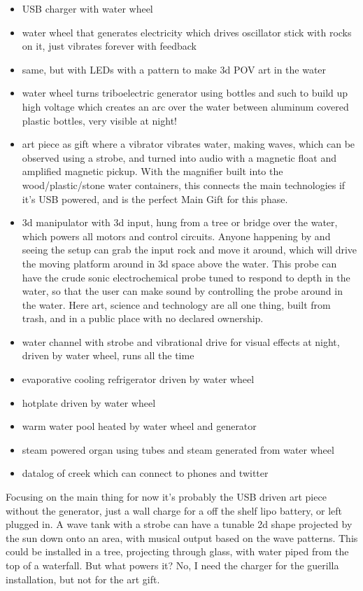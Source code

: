 \begin{itemize}
\tightlist
\item
  USB charger with water wheel
\item
  water wheel that generates electricity which drives oscillator stick
  with rocks on it, just vibrates forever with feedback
\item
  same, but with LEDs with a pattern to make 3d POV art in the water
\item
  water wheel turns triboelectric generator using bottles and such to
  build up high voltage which creates an arc over the water between
  aluminum covered plastic bottles, very visible at night!
\item
  art piece as gift where a vibrator vibrates water, making waves, which
  can be observed using a strobe, and turned into audio with a magnetic
  float and amplified magnetic pickup. With the magnifier built into the
  wood/plastic/stone water containers, this connects the main
  technologies if it's USB powered, and is the perfect Main Gift for
  this phase.
\item
  3d manipulator with 3d input, hung from a tree or bridge over the
  water, which powers all motors and control circuits. Anyone happening
  by and seeing the setup can grab the input rock and move it around,
  which will drive the moving platform around in 3d space above the
  water. This probe can have the crude sonic electrochemical probe tuned
  to respond to depth in the water, so that the user can make sound by
  controlling the probe around in the water. Here art, science and
  technology are all one thing, built from trash, and in a public place
  with no declared ownership.
\item
  water channel with strobe and vibrational drive for visual effects at
  night, driven by water wheel, runs all the time
\item
  evaporative cooling refrigerator driven by water wheel
\item
  hotplate driven by water wheel
\item
  warm water pool heated by water wheel and generator
\item
  steam powered organ using tubes and steam generated from water wheel
\item
  datalog of creek which can connect to phones and twitter
\end{itemize}

Focusing on the main thing for now it's probably the USB driven art
piece without the generator, just a wall charge for a off the shelf lipo
battery, or left plugged in. A wave tank with a strobe can have a
tunable 2d shape projected by the sun down onto an area, with musical
output based on the wave patterns. This could be installed in a tree,
projecting through glass, with water piped from the top of a waterfall.
But what powers it? No, I need the charger for the guerilla
installation, but not for the art gift.

